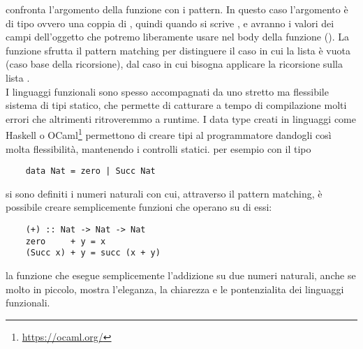  confronta l'argomento della funzione con i pattern. In questo caso l'argomento è di tipo  ovvero
una coppia di , quindi quando si scrive ,  e  avranno i valori dei campi dell'oggetto 
che potremo liberamente usare nel body della funzione ().
La funzione  sfrutta il pattern matching per distinguere il caso in cui la lista è vuota  (caso base della ricorsione), dal caso in cui
bisogna applicare la ricorsione sulla lista . 
\\I linguaggi funzionali sono spesso accompagnati da uno stretto ma flessibile sistema di tipi statico, che permette di catturare a tempo di compilazione molti errori che altrimenti ritroveremmo a runtime. I data type creati in linguaggi come Haskell o OCaml\footnote{\url{https://ocaml.org/}}
permettono di creare tipi al programmatore dandogli così molta flessibilità, mantenendo i controlli statici. per esempio con il tipo 
\begin{verbatim}
	data Nat = zero | Succ Nat
\end{verbatim}
si sono definiti i numeri naturali con cui, attraverso il pattern matching, è possibile creare semplicemente funzioni che operano su di essi:
\begin{verbatim}
	(+) :: Nat -> Nat -> Nat
	zero     + y = x
	(Succ x) + y = succ (x + y) 
\end{verbatim}
la funzione \code{(+)} che esegue semplicemente l'addizione su due numeri naturali, anche se molto in piccolo, mostra l'eleganza, la chiarezza e le pontenzialita dei linguaggi funzionali.


